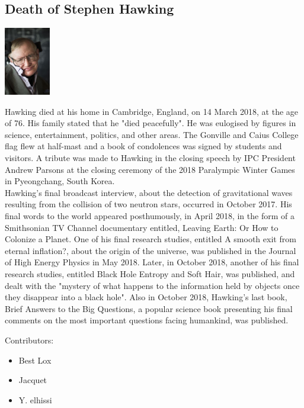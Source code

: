 \documentclass[11pt]{report}
\begin{document}
\subsection{Death of Stephen Hawking}
\vspace{2mm}\begin{center}\includegraphics[width=2cm]{./img/stephenHawking.jpg}\end{center}
Hawking died at his home in Cambridge, England, on 14 March 2018, at the age of 76. His family stated that he "died peacefully". He was eulogised by figures in science, entertainment, politics, and other areas. The Gonville and Caius College flag flew at half-mast and a book of condolences was signed by students and visitors. A tribute was made to Hawking in the closing speech by IPC President Andrew Parsons at the closing ceremony of the 2018 Paralympic Winter Games in Pyeongchang, South Korea.\\
\indent Hawking's final broadcast interview, about the detection of gravitational waves resulting from the collision of two neutron stars, occurred in October 2017. His final words to the world appeared posthumously, in April 2018, in the form of a Smithsonian TV Channel documentary entitled, Leaving Earth: Or How to Colonize a Planet. One of his final research studies, entitled A smooth exit from eternal inflation?, about the origin of the universe, was published in the Journal of High Energy Physics in May 2018. Later, in October 2018, another of his final research studies, entitled Black Hole Entropy and Soft Hair, was published, and dealt with the "mystery of what happens to the information held by objects once they disappear into a black hole". Also in October 2018, Hawking's last book, Brief Answers to the Big Questions, a popular science book presenting his final comments on the most important questions facing humankind, was published.

\pagebreak
Contributors: 
\begin{itemize}
\item Best Lox
\item Jacquet
\item Y. elhissi
\end{itemize}
\end{document}

